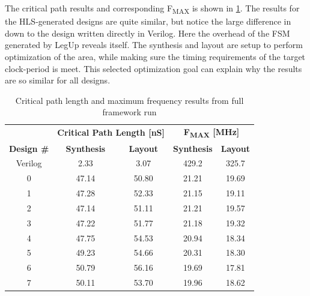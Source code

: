 The critical path results and corresponding F\textsubscript{MAX} is shown in \cref{tab:critpathfmax}. The results for the HLS-generated designs are quite similar, but notice the large difference in down to the design written directly in Verilog. Here the overhead of the FSM generated by LegUp reveals itself. The synthesis and layout are setup to perform optimization of the area, while making sure the timing requirements of the target clock-period is meet. This selected optimization goal can explain why the results are so similar for all designs. 
\begin{table}[hbtp]
    \centering
    \begin{tabular}{c|cc|cc}
     \multicolumn{1}{c}{} & \multicolumn{2}{c}{\textbf{Critical Path Length [nS]}} & \multicolumn{2}{c}{\textbf{F\textsubscript{MAX} [MHz]}}\\
     \cline{2-5}
     \textbf{Design \#} & \textbf{Synthesis} & \textbf{Layout} & \textbf{Synthesis} & \textbf{Layout} \\
    \toprule
    Verilog & 2.33 & 3.07 & 429.2 & 325.7 \\
    0 & 47.14 & 50.80 & 21.21 & 19.69\\
    1 & 47.28 & 52.33 & 21.15 & 19.11\\
    2 & 47.14 & 51.11 & 21.21 & 19.57\\
    3 & 47.22 & 51.77 & 21.18 & 19.32\\
    4 & 47.75 & 54.53 & 20.94 & 18.34\\
    5 & 49.23 & 54.66 & 20.31 & 18.30\\
    6 & 50.79 & 56.16 & 19.69 & 17.81\\
    7 & 50.11 & 53.70 & 19.96 & 18.62\\
    \bottomrule
    \end{tabular}
    \caption{Critical path length and maximum frequency results from full framework run}
    \label{tab:critpathfmax}
\end{table}
       
